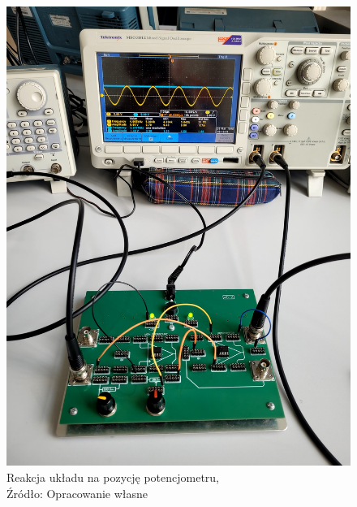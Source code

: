 \documentclass{article}
\begin{document}
\begin{figure}[!ht]
\begin{minipage}{.5\textwidth}
      \includegraphics[scale=0.06]{grafiki/reakcja1.jpg}
      \caption{Reakcja układu na pozycję potencjometru,
      \\Źródło: Opracowanie własne}
    \end{minipage}
  \end{figure}
\end{document}
